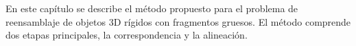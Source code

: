 En este capítulo se describe el método propuesto para el problema de reensamblaje de objetos 3D rígidos con fragmentos gruesos. El método comprende dos etapas principales, la correspondencia y la alineación. 
